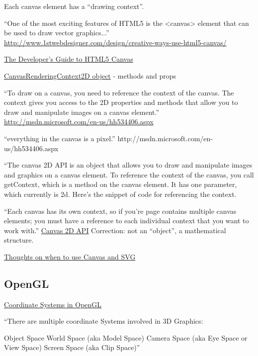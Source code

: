 \documentclass[12pt]{tufte-handout}
\numberwithin{equation}{subsection}
\numberwithin{equation}{subsection}
\begin{document}
\begin{appendices}
    Each canvas element has a ``drawing context''.

    ``One of the most exciting features of HTML5 is the <canvas> element that can be used to draw vector graphics...'' \url{http://www.1stwebdesigner.com/design/creative-ways-use-html5-canvas/}


    \href{http://msdn.microsoft.com/en-us/hh534406.aspx}{The Developer’s Guide to HTML5 Canvas}

    \href{http://msdn.microsoft.com/en-us/library/ff975057.aspx}{CanvasRenderingContext2D object} - methods and props

    ``To draw on a canvas, you need to reference the context of the canvas.  The context gives you access to the 2D properties and methods that allow you to draw and manipulate images on a canvas element.'' \url{http://msdn.microsoft.com/en-us/hh534406.aspx}

    ``everything in the canvas is a pixel.'' http://msdn.microsoft.com/en-us/hh534406.aspx

    ``The canvas 2D API is an object that allows you to draw and
    manipulate images and graphics on a canvas element.  To reference the context of the canvas, you call getContext, which is a method on the canvas element.  It has one parameter, which currently is 2d.  Here’s the snippet of code for referencing the context.

    ``Each canvas has its own context, so if you’re page contains multiple canvas elements; you must have a reference to each individual context that you want to work with.'' \url{Canvas 2D
      API}  Correction: not an ``object'', a mathematical structure.

    \href{http://blogs.msdn.com/b/ie/archive/2011/04/22/thoughts-on-when-to-use-canvas-and-svg.aspx}{Thoughts on when to use Canvas and SVG}

    \subsection{OpenGL}
    \label{subs:opengl}


    \href{http://www.matrix44.net/cms/notes/opengl-3d-graphics/coordinate-systems-in-opengl}{Coordinate Systems in OpenGL}

    ``There are multiple coordinate Systems involved in 3D Graphics:

    Object Space
    World Space (aka Model Space)
    Camera Space (aka Eye Space or View Space)
    Screen Space (aka Clip Space)''


\end{appendices}
\end{document}
